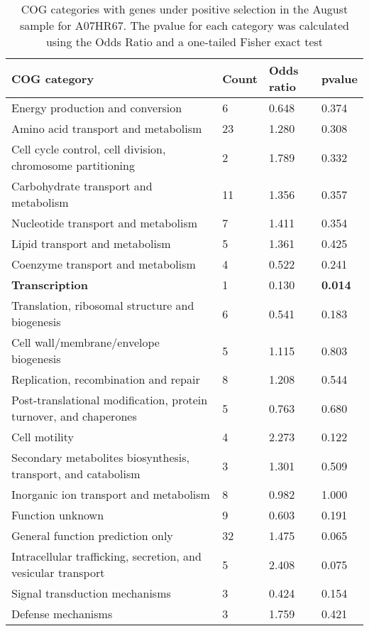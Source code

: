 \begin{table}[hb]
\footnotesize 
	\tabcolsep=0.11cm 
\caption{COG categories with genes under positive selection in the August sample for A07HR67. The pvalue for each category was calculated using the Odds Ratio and a one-tailed Fisher exact test \\} 
\begin{tabularx}{\textwidth}{L{6cm}R{2cm}R{2cm}R{2cm}} 
\hline 
\textbf{COG category} & \textbf{Count} & \textbf{Odds ratio} & \textbf{pvalue} \\ 
\hline 
Energy production and conversion & 6 & 0.648 & 0.374 \\ 
Amino acid transport and metabolism & 23 & 1.280 & 0.308 \\ 
Cell cycle control, cell division, chromosome partitioning & 2 & 1.789 & 0.332 \\ 
Carbohydrate transport and metabolism & 11 & 1.356 & 0.357 \\ 
Nucleotide transport and metabolism & 7 & 1.411 & 0.354 \\ 
Lipid transport and metabolism & 5 & 1.361 & 0.425 \\ 
Coenzyme transport and metabolism & 4 & 0.522 & 0.241 \\ 
\textbf{Transcription} & 1 & 0.130 & \textbf{0.014} \\ 
Translation, ribosomal structure and biogenesis & 6 & 0.541 & 0.183 \\ 
Cell wall/membrane/envelope biogenesis & 5 & 1.115 & 0.803 \\ 
Replication, recombination and repair & 8 & 1.208 & 0.544 \\ 
Post-translational modification, protein turnover, and chaperones & 5 & 0.763 & 0.680 \\ 
Cell motility & 4 & 2.273 & 0.122 \\ 
Secondary metabolites biosynthesis, transport, and catabolism & 3 & 1.301 & 0.509 \\ 
Inorganic ion transport and metabolism & 8 & 0.982 & 1.000 \\ 
Function unknown & 9 & 0.603 & 0.191 \\ 
General function prediction only & 32 & 1.475 & 0.065 \\ 
Intracellular trafficking, secretion, and vesicular transport & 5 & 2.408 & 0.075 \\ 
Signal transduction mechanisms & 3 & 0.424 & 0.154 \\ 
Defense mechanisms & 3 & 1.759 & 0.421 \\ 
\end{tabularx} 
\label{August_COG_Selection_A07HR67} 
 \end{table} 

